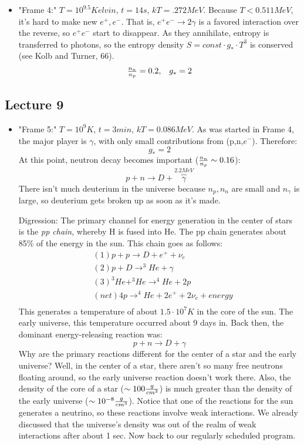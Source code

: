\documentclass{article}
\begin{document}
\begin{itemize}
\item"Frame 4:" $T=10^{9.5} Kelvin$, $t=14s$, $kT=.272MeV$.  Because
$T<0.511MeV$, it's hard to make new $e^+,e^-$.  That is, $e^+e^-\to 2\gamma$
is a favored interaction over the reverse, so $e^+e^-$ start to disappear.
As they annihilate, entropy is transferred to photons, so the entropy density
$S=const\cdot g_*\cdot T^3$ is conserved (see Kolb and Turner, 66).
$$\begin{matrix} {n_n\over n_p}=0.2,& g_*=2\end{matrix}$$
\end{itemize}


\subsection{Lecture 9}

\begin{itemize}
\item"Frame 5:" $T=10^9K$, $t=3min$, $kT=0.086MeV$.  As was started in Frame 4,
the major player is $\gamma$, with only small contributions from (p,n,$e^-$).
Therefore:
$$g_*=2$$
At this point, neutron decay becomes important (${n_n\over n_p}\sim0.16$):
$$p+n\to D+\overbrace{\gamma}^{2.2MeV}$$
There isn't much deuterium in the universe because $n_p,n_n$ are small and
$n_\gamma$ is large, so deuterium gets broken up as soon as it's made.\par
Digression: The primary channel for energy generation in the center of stars
is the {\it pp chain}, whereby H is fused into He.  The pp chain generates
about 85\% of the energy in the sun.  This chain goes as follows:
\begin{align}
&(1) p+p\to D+e^++\nu_e\\
&(2) p+D\to ^3He+\gamma\\
&(3) ^3He+^3He\to ^4He+2p\\
&(net) 4p\to ^4He+2e^++2\nu_e+energy\\
\end{align}
This generates a temperature of about $1.5\cdot10^7K$ in the core of the sun.
The early universe, this temperature occurred about 9 days in.  Back then,
the dominant energy-releasing reaction was:
$$p+n\to D+\gamma$$
Why are the primary reactions different for the center of a star and the
early universe?  Well, in the center of a star, there aren't so many free
neutrons floating around, so the early universe reaction doesn't work there.
Also, the density of the core of a star ($\sim100{g\over cm^3}$) is much
greater than the density of the early universe ($\sim10^{-8}{g\over cm^3}$).
Notice that one of the reactions for the sun generates a neutrino, so these
reactions involve weak interactions.  We already discussed that the universe's
density was out of the realm of weak interactions after about 1 sec.  Now back
to our regularly scheduled program.


\end{itemize}
\end{document}
